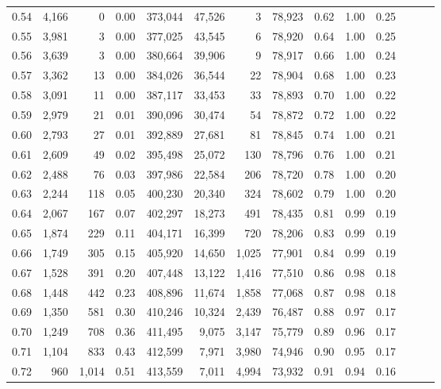 \begin{tabular}{rrrrrrrrrrrrrr}
0.54 &  4,166 &      0 &  0.00 &  373,044 &   47,526 &       3 &  78,923 &  0.62 &  1.00 &      0.25 \\
0.55 &  3,981 &      3 &  0.00 &  377,025 &   43,545 &       6 &  78,920 &  0.64 &  1.00 &      0.25 \\
0.56 &  3,639 &      3 &  0.00 &  380,664 &   39,906 &       9 &  78,917 &  0.66 &  1.00 &      0.24 \\
0.57 &  3,362 &     13 &  0.00 &  384,026 &   36,544 &      22 &  78,904 &  0.68 &  1.00 &      0.23 \\
0.58 &  3,091 &     11 &  0.00 &  387,117 &   33,453 &      33 &  78,893 &  0.70 &  1.00 &      0.22 \\
0.59 &  2,979 &     21 &  0.01 &  390,096 &   30,474 &      54 &  78,872 &  0.72 &  1.00 &      0.22 \\
0.60 &  2,793 &     27 &  0.01 &  392,889 &   27,681 &      81 &  78,845 &  0.74 &  1.00 &      0.21 \\
0.61 &  2,609 &     49 &  0.02 &  395,498 &   25,072 &     130 &  78,796 &  0.76 &  1.00 &      0.21 \\
0.62 &  2,488 &     76 &  0.03 &  397,986 &   22,584 &     206 &  78,720 &  0.78 &  1.00 &      0.20 \\
0.63 &  2,244 &    118 &  0.05 &  400,230 &   20,340 &     324 &  78,602 &  0.79 &  1.00 &      0.20 \\
0.64 &  2,067 &    167 &  0.07 &  402,297 &   18,273 &     491 &  78,435 &  0.81 &  0.99 &      0.19 \\
0.65 &  1,874 &    229 &  0.11 &  404,171 &   16,399 &     720 &  78,206 &  0.83 &  0.99 &      0.19 \\
0.66 &  1,749 &    305 &  0.15 &  405,920 &   14,650 &   1,025 &  77,901 &  0.84 &  0.99 &      0.19 \\
0.67 &  1,528 &    391 &  0.20 &  407,448 &   13,122 &   1,416 &  77,510 &  0.86 &  0.98 &      0.18 \\
0.68 &  1,448 &    442 &  0.23 &  408,896 &   11,674 &   1,858 &  77,068 &  0.87 &  0.98 &      0.18 \\
0.69 &  1,350 &    581 &  0.30 &  410,246 &   10,324 &   2,439 &  76,487 &  0.88 &  0.97 &      0.17 \\
0.70 &  1,249 &    708 &  0.36 &  411,495 &    9,075 &   3,147 &  75,779 &  0.89 &  0.96 &      0.17 \\
0.71 &  1,104 &    833 &  0.43 &  412,599 &    7,971 &   3,980 &  74,946 &  0.90 &  0.95 &      0.17 \\
0.72 &    960 &  1,014 &  0.51 &  413,559 &    7,011 &   4,994 &  73,932 &  0.91 &  0.94 &      0.16 \\

\end{tabular}
